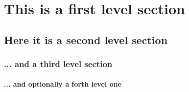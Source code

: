 \documentclass[italian, isTemplate, disablemarginnotes]{../Utils/ClassNotes}
\begin{document}
\section{This is a first level section}
\lipsum[1-3]
\subsection{Here it is a second level section}
\lipsum[4-5]
\subsubsection{... and a third level section}
\lipsum[6]
\paragraph{... and optionally a forth level one}
\lipsum[7]
\end{document}
